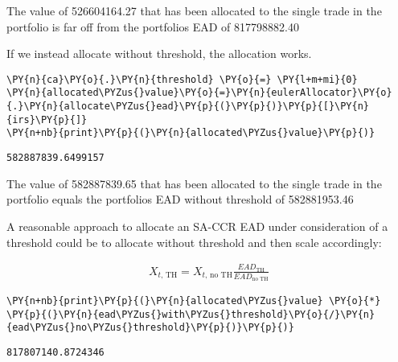     The value of 526604164.27 that has been allocated to the single trade in
the portfolio is far off from the portfolios EAD of 817798882.40

    
    If we instead allocate without threshold, the allocation works.

    \begin{tcolorbox}[breakable, size=fbox, boxrule=1pt, pad at break*=1mm,colback=cellbackground, colframe=cellborder]
\begin{Verbatim}[commandchars=\\\{\}]
\PY{n}{ca}\PY{o}{.}\PY{n}{threshold} \PY{o}{=} \PY{l+m+mi}{0}
\PY{n}{allocated\PYZus{}value}\PY{o}{=}\PY{n}{eulerAllocator}\PY{o}{.}\PY{n}{allocate\PYZus{}ead}\PY{p}{(}\PY{p}{)}\PY{p}{[}\PY{n}{irs}\PY{p}{]}
\PY{n+nb}{print}\PY{p}{(}\PY{n}{allocated\PYZus{}value}\PY{p}{)}
\end{Verbatim}
\end{tcolorbox}

    \begin{Verbatim}[commandchars=\\\{\}]
582887839.6499157
    \end{Verbatim}

    The value of 582887839.65 that has been allocated to the single trade in
the portfolio equals the portfolios EAD without threshold of
582881953.46

    
    A reasonable approach to allocate an SA-CCR EAD under consideration of a
threshold could be to allocate without threshold and then scale
accordingly:

\begin{align*}
    X_{t\text{, TH}} = X_{t\text{, no TH}} \frac{EAD_{\text{TH}}}{EAD_{\text{no TH}}}
\end{align*}

    \begin{tcolorbox}[breakable, size=fbox, boxrule=1pt, pad at break*=1mm,colback=cellbackground, colframe=cellborder]
\begin{Verbatim}[commandchars=\\\{\}]
\PY{n+nb}{print}\PY{p}{(}\PY{n}{allocated\PYZus{}value} \PY{o}{*} \PY{p}{(}\PY{n}{ead\PYZus{}with\PYZus{}threshold}\PY{o}{/}\PY{n}{ead\PYZus{}no\PYZus{}threshold}\PY{p}{)}\PY{p}{)}
\end{Verbatim}
\end{tcolorbox}

    \begin{Verbatim}[commandchars=\\\{\}]
817807140.8724346
    \end{Verbatim}


